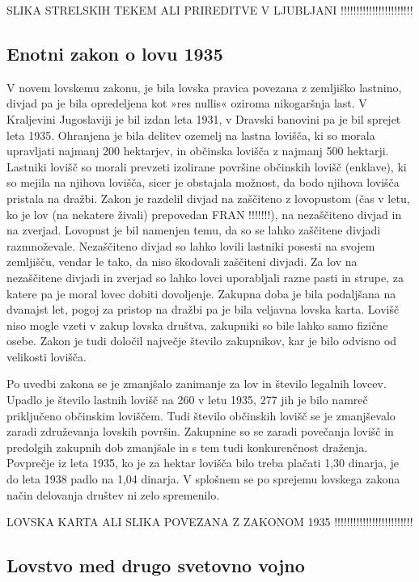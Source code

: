 \documentclass[a4paper,12pt,openright]{book}
\begin{document}
SLIKA STRELSKIH TEKEM ALI PRIREDITVE V LJUBLJANI !!!!!!!!!!!!!!!!!!!!!!!

\subsection{Enotni zakon o lovu 1935}
 
V novem lovskemu zakonu, je bila lovska pravica povezana z zemljiško lastnino, divjad pa je bila opredeljena kot »res nullis« oziroma nikogaršnja last.
V Kraljevini Jugoslaviji je bil izdan leta 1931, v Dravski banovini pa je bil sprejet leta 1935. 
Ohranjena je bila delitev ozemelj na lastna lovišča, ki so morala upravljati najmanj 200 hektarjev, in občinska lovišča z najmanj 500 hektarji.
Lastniki lovišč so morali prevzeti izolirane površine občinskih lovišč (enklave), ki so mejila na njihova lovišča, sicer je obstajala možnost, da bodo njihova lovišča pristala na dražbi. 
Zakon je razdelil divjad na zaščiteno z lovopustom (čas v letu, ko je lov (na nekatere živali) prepovedan FRAN !!!!!!!), na nezaščiteno divjad in na zverjad. 
Lovopust je bil namenjen temu, da so se lahko zaščitene divjadi razmnoževale. 
Nezaščiteno divjad so lahko lovili lastniki posesti na svojem zemljišču, vendar le tako, da niso škodovali zaščiteni divjadi.
Za lov na nezaščitene divjadi in zverjad so lahko lovci uporabljali razne pasti in strupe, za katere pa je moral lovec dobiti dovoljenje.
Zakupna doba je bila podaljšana na dvanajst let, pogoj za pristop na dražbi pa je bila veljavna lovska karta.
Lovišč niso mogle vzeti v zakup lovska društva, zakupniki so bile lahko samo fizične osebe. Zakon je tudi določil največje število zakupnikov, kar je bilo odvisno od velikosti lovišča. \cite{Lov_170_175}

Po uvedbi zakona se je zmanjšalo zanimanje za lov in število legalnih lovcev.
Upadlo je število lastnih lovišč na 260 v letu 1935, 277 jih je bilo namreč priključeno občinskim loviščem.
Tudi število občinskih lovišč se je zmanjševalo zaradi združevanja lovskih površin. 
Zakupnine so se zaradi povečanja lovišč in predolgih zakupnih dob zmanjšale in s tem tudi konkurenčnost draženja.
Povprečje iz leta 1935, ko je za hektar lovišča bilo treba plačati 1,30 dinarja, je do leta 1938 padlo na 1,04 dinarja.
V splošnem se po sprejemu lovskega zakona način delovanja društev ni zelo spremenilo. \cite{Lov_176_178}

LOVSKA KARTA ALI SLIKA POVEZANA Z ZAKONOM 1935 !!!!!!!!!!!!!!!!!!!!!!!!!

\subsection{Lovstvo med drugo svetovno vojno}
\end{document}
